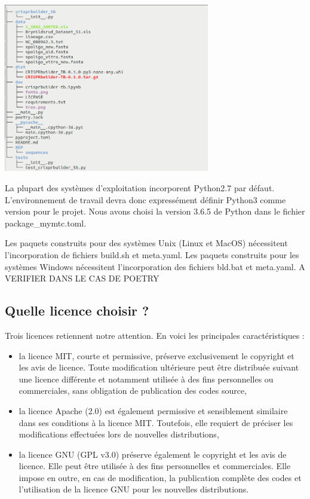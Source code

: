 \documentclass[twoside,a4paper,11pt,frenchb,openany]{report}
\begin{document}
\includegraphics[width=9cm]{package_tree.png}

	La plupart des systèmes d'exploitation incorporent Python2.7 par défaut. L'environnement de travail devra donc expressément définir Python3 comme version pour le projet. Nous avons choisi la version 3.6.5 de Python dans le fichier package\_mymtc.toml.

Les paquets construits pour des systèmes Unix (Linux et MacOS) nécessitent l'incorporation de fichiers build.sh et meta.yaml. Les paquets construits pour les systèmes Windows nécessitent l'incorporation des fichiers bld.bat et meta.yaml. A VERIFIER DANS LE CAS DE POETRY


\subsection{Quelle licence choisir ?}
	
Trois licences retiennent notre attention. En voici les principales caractéristiques :
\begin{itemize}
\item	la licence MIT, courte et permissive, préserve exclusivement le copyright et les avis de licence. Toute modification ultérieure peut être distribuée suivant une licence différente et notamment utilisée à des fins personnelles ou commerciales, sans obligation de publication des codes source,
\item	la licence Apache (2.0) est également permissive et sensiblement similaire dans ses conditions à la licence MIT. Toutefois, elle requiert de préciser les modifications effectuées lors de nouvelles distributions,
\item	la licence GNU (GPL v3.0) préserve également le copyright et les avis de licence. Elle peut être utilisée à des fins personnelles et commerciales. Elle impose en outre, en cas de modification, la publication complète des codes et l'utilisation de la licence GNU pour les nouvelles distributions.
\end{itemize}
\end{document}

